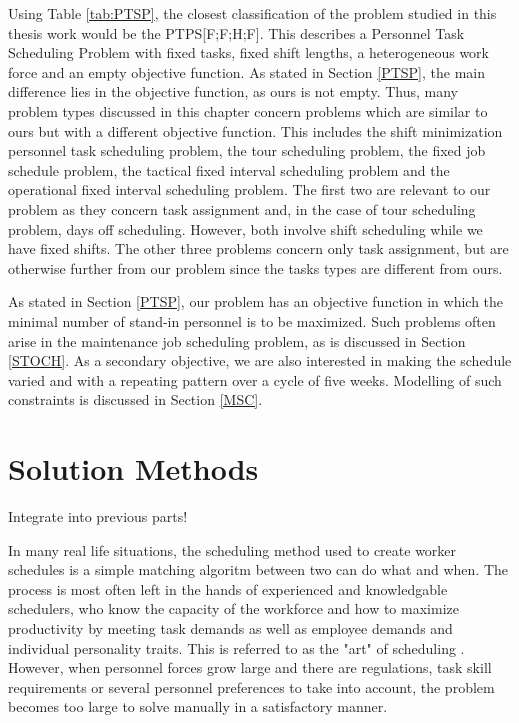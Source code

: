 Using Table \ref{tab:PTSP}, the closest classification of the problem studied in this thesis work would be the PTPS[F;F;H;F]. This describes a Personnel Task Scheduling Problem with fixed tasks, fixed shift lengths, a heterogeneous work force and an empty objective function. As stated in Section \ref{PTSP}, the main difference lies in the objective function, as ours is not empty. Thus, many problem types discussed in this chapter concern problems which are similar to ours but with a different objective function. This includes the shift minimization personnel task scheduling problem, the tour scheduling problem, the fixed job schedule problem, the tactical fixed interval scheduling problem and the operational fixed interval scheduling problem. The first two are relevant to our problem as they concern task assignment and, in the case of tour scheduling problem, days off scheduling. However, both involve shift scheduling while we have fixed shifts. The other three problems concern only task assignment, but are otherwise further from our problem since the tasks types are different from ours.

As stated in Section \ref{PTSP}, our problem has an objective function in which the minimal number of stand-in personnel is to be maximized. Such problems often arise in the maintenance job scheduling problem, as is discussed in Section \ref{STOCH}. As a secondary objective, we are also interested in making the schedule varied and with a repeating pattern over a cycle of five weeks. Modelling of such constraints is discussed in Section \ref{MSC}.











\iffalse


\section{Solution Methods}
Integrate into previous parts!


In many real life situations, the scheduling method used to create worker schedules is a simple matching algoritm between two can do what and when. The process is most often left in the hands of experienced and knowledgable schedulers, who know the capacity of the workforce and how to maximize productivity by meeting task demands as well as employee demands and individual personality traits. This is referred to as the "art" of scheduling \citet{roberts_1983}. However, when personnel forces grow large and there are regulations, task skill requirements or several personnel preferences to take into account, the problem becomes too large to solve manually in a satisfactory manner.

